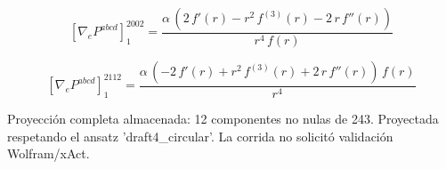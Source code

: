 \documentclass[11pt]{article}
\begin{document}
\begin{dmath*}[breakdepth={5}]
\left[\nabla_e P^{abcd}\right]_{1}^{2002} = \frac{\alpha\,\left(2\,f'\!\left(r\right) - {r}^{2}\,f^{(3)}\!\left(r\right) - 2\,r\,f''\!\left(r\right)\right)}{{r}^{4}\,f\!\left(r\right)}
\end{dmath*}
\par\smallskip
\begin{dmath*}[breakdepth={5}]
\left[\nabla_e P^{abcd}\right]_{1}^{2112} = \frac{\alpha\,\left(-2\,f'\!\left(r\right) + {r}^{2}\,f^{(3)}\!\left(r\right) + 2\,r\,f''\!\left(r\right)\right)\,f\!\left(r\right)}{{r}^{4}}
\end{dmath*}
\par\smallskip
Proyección completa almacenada: 12 componentes no nulas de 243. Proyectada respetando el ansatz 'draft4\_circular'. La corrida no solicitó validación Wolfram/xAct.\par\medskip
{}
\end{document}
